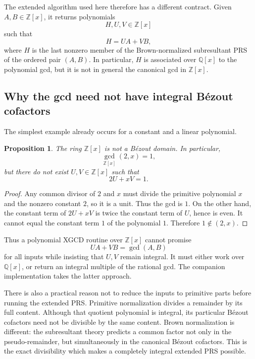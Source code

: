 \documentclass[11pt]{book}
\newtheorem{proposition}[theorem]{Proposition}
\theoremstyle{definition}
\newcommand{\ZZ}{\mathbb Z}
\begin{document}
The extended algorithm used here therefore has a different contract.  Given
$A,B\in\ZZ[x]$, it returns polynomials
\[
 H,U,V\in\ZZ[x]
\]
such that
\begin{equation}\label{eq:xgcd-certificate}
 H=UA+VB,
\end{equation}
where $H$ is the last nonzero member of the Brown-normalized subresultant PRS
of the ordered pair $(A,B)$.  In particular, $H$ is associated over
$\mathbb Q[x]$ to the polynomial gcd, but it is not in general the canonical
gcd in $\ZZ[x]$.

\subsection{Why the gcd need not have integral B\'ezout cofactors}

The simplest example already occurs for a constant and a linear polynomial.

\begin{proposition}\label{prop:zpoly-not-bezout}
The ring $\ZZ[x]$ is not a B\'ezout domain.  In particular,
\[
 \gcd_{\ZZ[x]}(2,x)=1,
\]
but there do not exist $U,V\in\ZZ[x]$ such that
\[
 2U+xV=1.
\]
\end{proposition}

\begin{proof}
Any common divisor of $2$ and $x$ must divide the primitive polynomial $x$
and the nonzero constant $2$, so it is a unit.  Thus the gcd is $1$.
On the other hand, the constant term of $2U+xV$ is twice the constant term of
$U$, hence is even.  It cannot equal the constant term $1$ of the polynomial
$1$.  Therefore $1\notin(2,x)$.
\end{proof}

Thus a polynomial XGCD routine over $\ZZ[x]$ cannot promise
\[
 UA+VB=\gcd(A,B)
\]
for all inputs while insisting that $U,V$ remain integral.  It must either
work over $\mathbb Q[x]$, or return an integral multiple of the rational gcd.
The companion implementation takes the latter approach.

There is also a practical reason not to reduce the inputs to primitive parts
before running the extended PRS.  Primitive normalization divides a remainder
by its full content.  Although that quotient polynomial is integral, its
particular B\'ezout cofactors need not be divisible by the same content.
Brown normalization is different: the subresultant theory predicts a common
factor not only in the pseudo-remainder, but simultaneously in the canonical
B\'ezout cofactors.  This is the exact divisibility which makes a completely
integral extended PRS possible.
\end{document}
